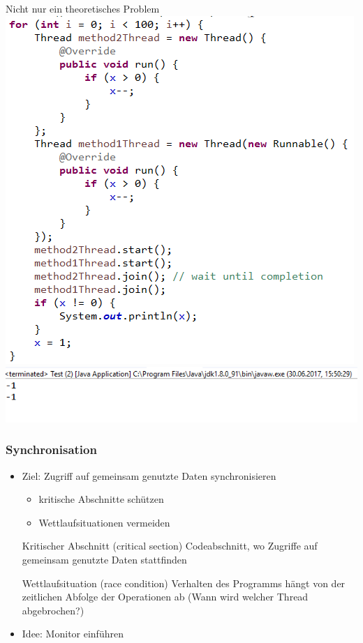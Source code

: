 \documentclass[18pt]{beamer}
\begin{document}
	\begin{frame}{Nicht nur ein theoretisches Problem}
		\centering
		\includegraphics[scale=0.43]{./pics/tut5/synch-ex.png} \pause
		\includegraphics[scale=0.43]{./pics/tut5/synch-ex2.png}
	\end{frame}

	\begin{frame}
		\frametitle{Synchronisation}
		\begin{itemize}
			\item Ziel: Zugriff auf gemeinsam genutzte Daten synchronisieren \pause 
			\begin{itemize}
				\item kritische Abschnitte schützen \pause
				\item Wettlaufsituationen vermeiden
			\end{itemize}
			\begin{block}{Kritischer Abschnitt (critical section)}
				Codeabschnitt, wo Zugriffe auf gemeinsam genutzte Daten stattfinden
			\end{block} \pause
			\begin{block}{Wettlaufsituation (race condition)}
				Verhalten des Programms hängt von der zeitlichen Abfolge der Operationen ab (Wann wird welcher Thread abgebrochen?)
			\end{block} \pause
			\item Idee: Monitor einführen
		\end{itemize}
	\end{frame}
\end{document}
